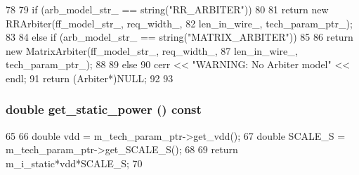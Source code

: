 \begin{DoxyCode}
78 {
79     if (arb_model_str_ == string("RR_ARBITER")) {
80 
81         return new RRArbiter(ff_model_str_, req_width_, 
82                              len_in_wire_, tech_param_ptr_);
83 
84     } else if (arb_model_str_ == string("MATRIX_ARBITER")) {
85 
86         return new MatrixArbiter(ff_model_str_, req_width_, 
87                                  len_in_wire_, tech_param_ptr_);
88 
89     } else {
90         cerr << "WARNING: No Arbiter model" << endl;
91         return (Arbiter*)NULL;
92     }
93 }
\end{DoxyCode}
\hypertarget{classArbiter_aeb5933543cfdeb1668baed5ce7c68351}{
\subsubsection[{get\_\-static\_\-power}]{\setlength{\rightskip}{0pt plus 5cm}double get\_\-static\_\-power () const}}
\label{classArbiter_aeb5933543cfdeb1668baed5ce7c68351}



\begin{DoxyCode}
65 {
66     double vdd = m_tech_param_ptr->get_vdd();
67     double SCALE_S = m_tech_param_ptr->get_SCALE_S();
68 
69     return m_i_static*vdd*SCALE_S;
70 }
\end{DoxyCode}


